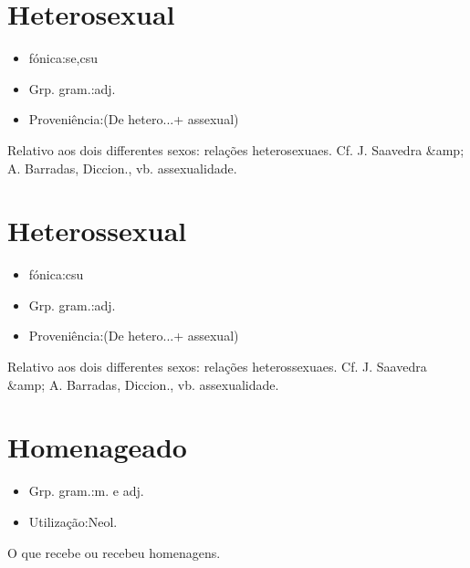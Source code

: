 \documentclass{article}
\begin{document}
\section{Heterosexual}
\begin{itemize}
\item {fónica:se,csu}
\end{itemize}
\begin{itemize}
\item {Grp. gram.:adj.}
\end{itemize}
\begin{itemize}
\item {Proveniência:(De \textunderscore hetero...\textunderscore  + \textunderscore assexual\textunderscore )}
\end{itemize}
Relativo aos dois differentes sexos: \textunderscore relações heterosexuaes\textunderscore . Cf. J. Saavedra &amp; A. Barradas, \textunderscore Diccion.\textunderscore , vb. \textunderscore assexualidade\textunderscore .
\section{Heterossexual}
\begin{itemize}
\item {fónica:csu}
\end{itemize}
\begin{itemize}
\item {Grp. gram.:adj.}
\end{itemize}
\begin{itemize}
\item {Proveniência:(De \textunderscore hetero...\textunderscore  + \textunderscore assexual\textunderscore )}
\end{itemize}
Relativo aos dois differentes sexos: \textunderscore relações heterossexuaes\textunderscore . Cf. J. Saavedra &amp; A. Barradas, \textunderscore Diccion.\textunderscore , vb. \textunderscore assexualidade\textunderscore .
\section{Homenageado}
\begin{itemize}
\item {Grp. gram.:m.  e  adj.}
\end{itemize}
\begin{itemize}
\item {Utilização:Neol.}
\end{itemize}
O que recebe ou recebeu homenagens.
\end{document}
